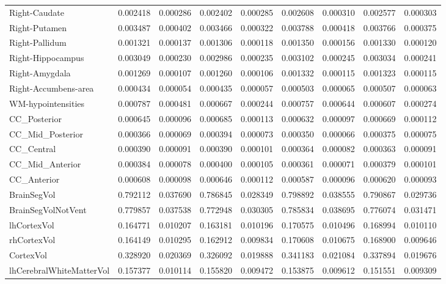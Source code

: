 \begin{table}[H]
\begin{tabular}{l|cc|cc|cc|cc}
Right-Caudate & 0.002418 & 0.000286 & 0.002402 & 0.000285 & 0.002608 & 0.000310 & 0.002577 & 0.000303 \\
Right-Putamen & 0.003487 & 0.000402 & 0.003466 & 0.000322 & 0.003788 & 0.000418 & 0.003766 & 0.000375 \\
Right-Pallidum & 0.001321 & 0.000137 & 0.001306 & 0.000118 & 0.001350 & 0.000156 & 0.001330 & 0.000120 \\
Right-Hippocampus & 0.003049 & 0.000230 & 0.002986 & 0.000235 & 0.003102 & 0.000245 & 0.003034 & 0.000241 \\
Right-Amygdala & 0.001269 & 0.000107 & 0.001260 & 0.000106 & 0.001332 & 0.000115 & 0.001323 & 0.000115 \\
Right-Accumbens-area & 0.000434 & 0.000054 & 0.000435 & 0.000057 & 0.000503 & 0.000065 & 0.000507 & 0.000063 \\
WM-hypointensities & 0.000787 & 0.000481 & 0.000667 & 0.000244 & 0.000757 & 0.000644 & 0.000607 & 0.000274 \\
CC_Posterior & 0.000645 & 0.000096 & 0.000685 & 0.000113 & 0.000632 & 0.000097 & 0.000669 & 0.000112 \\
CC_Mid_Posterior & 0.000366 & 0.000069 & 0.000394 & 0.000073 & 0.000350 & 0.000066 & 0.000375 & 0.000075 \\
CC_Central & 0.000390 & 0.000091 & 0.000390 & 0.000101 & 0.000364 & 0.000082 & 0.000363 & 0.000091 \\
CC_Mid_Anterior & 0.000384 & 0.000078 & 0.000400 & 0.000105 & 0.000361 & 0.000071 & 0.000379 & 0.000101 \\
CC_Anterior & 0.000608 & 0.000098 & 0.000646 & 0.000112 & 0.000587 & 0.000096 & 0.000620 & 0.000093 \\
BrainSegVol & 0.792112 & 0.037690 & 0.786845 & 0.028349 & 0.798892 & 0.038555 & 0.790867 & 0.029736 \\
BrainSegVolNotVent & 0.779857 & 0.037538 & 0.772948 & 0.030305 & 0.785834 & 0.038695 & 0.776074 & 0.031471 \\
lhCortexVol & 0.164771 & 0.010207 & 0.163181 & 0.010196 & 0.170575 & 0.010496 & 0.168994 & 0.010110 \\
rhCortexVol & 0.164149 & 0.010295 & 0.162912 & 0.009834 & 0.170608 & 0.010675 & 0.168900 & 0.009646 \\
CortexVol & 0.328920 & 0.020369 & 0.326092 & 0.019888 & 0.341183 & 0.021084 & 0.337894 & 0.019676 \\
lhCerebralWhiteMatterVol & 0.157377 & 0.010114 & 0.155820 & 0.009472 & 0.153875 & 0.009612 & 0.151551 & 0.009309 \\

\end{tabular}
\end{table}
